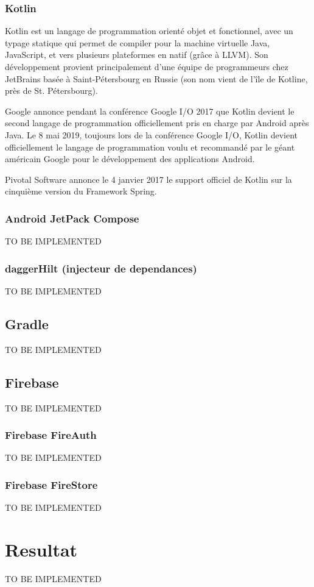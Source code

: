 \subsubsection{Kotlin}
Kotlin est un langage de programmation orienté objet et fonctionnel, avec un typage statique qui permet de compiler pour la machine virtuelle Java, JavaScript, et vers plusieurs plateformes en natif (grâce à LLVM). Son développement provient principalement d'une équipe de programmeurs chez JetBrains basée à Saint-Pétersbourg en Russie (son nom vient de l'île de Kotline, près de St. Pétersbourg).

Google annonce pendant la conférence Google I/O 2017 que Kotlin devient le second langage de programmation officiellement pris en charge par Android après Java. Le 8 mai 2019, toujours lors de la conférence Google I/O, Kotlin devient officiellement le langage de programmation voulu et recommandé par le géant américain Google pour le développement des applications Android.

Pivotal Software annonce le 4 janvier 2017 le support officiel de Kotlin sur la cinquième version du Framework Spring. 
\cite*{wiki:Kotlin}
\subsubsection{Android JetPack Compose}
TO BE IMPLEMENTED
\subsubsection{daggerHilt (injecteur de dependances)}
TO BE IMPLEMENTED
\subsection{Gradle}
TO BE IMPLEMENTED
\subsection{Firebase}
TO BE IMPLEMENTED
\subsubsection{Firebase FireAuth}
TO BE IMPLEMENTED
\subsubsection{Firebase FireStore}
TO BE IMPLEMENTED
\section{Resultat}
TO BE IMPLEMENTED
